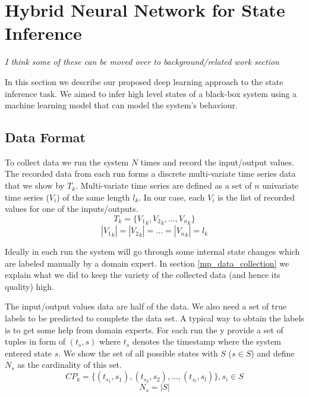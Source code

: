 \section{Hybrid Neural Network for State Inference}
\textit{I think some of these can be moved over to background/related work section}

In this section we describe our proposed deep learning approach to the state inference task. 
We aimed to infer high level states of a black-box system using a machine learning model that can model the system's behaviour. 

\subsection{Data Format} \label{data_collection}

To collect data we run the system $N$ times and record the input/output values. The recorded data from each run forms a discrete multi-variate time series data that we show by $T_k$. 
Multi-variate time series are defined as a set of $n$ univariate time series ($V_i$) of the same length $l_k$. In our case, each $V_i$ is the list of recorded values for one of the inputs/outputs.
\begin{equation}
    T_k = \{{V_1}_k, {V_2}_k, \ldots, {V_n}_k\}
\end{equation}
\begin{equation}
    |{V_1}_k|=|{V_2}_k|=\ldots=|{V_n}_k|=l_k 
\end{equation}


Ideally in each run the system will go through some internal state changes which are labeled manually by a domain expert. In section \ref{mp_data_collection} we explain what we did to keep the variety of the collected data (and hence its quality) high.

The input/output values data are half of the data. We also need a set of true labels to be predicted to complete the data set.
A typical way to obtain the labels is to get some help from domain experts. For each run the y provide a set of tuples in form of $(t_s, s)$ where $t_s$ denotes the timestamp where the system entered state $s$. We show the set of all possible states with $S$ ($s \in S$) and define $N_s$ as the cardinality of this set. 
\begin{equation}\label{eq:change_point}
    CP_k = \big\{ (t_{s_1}, s_1), (t_{s_2}, s_2), \ldots, (t_{s_l}, s_l) \big\} , s_i \in S
\end{equation}
$$N_s = |S|$$


